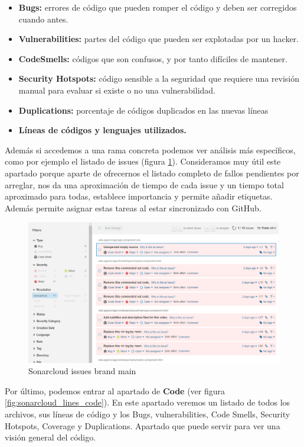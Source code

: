 \begin{itemize}
    \item \textbf{Bugs:} errores de código que pueden romper el código y deben ser corregidos cuando antes. 
    \item \textbf{Vulnerabilities:} partes del código que pueden ser explotadas por un hacker.
    \item \textbf{CodeSmells: } códigos que son confusos, y por tanto difíciles de mantener.
    \item \textbf{Security Hotspots: } código sensible a la seguridad que requiere una revisión manual para evaluar si existe o no una vulnerabilidad.
    \item \textbf{Duplications:} porcentaje de códigos duplicados en las nuevas líneas
    \item \textbf{Líneas de códigos y lenguajes utilizados.}
\end{itemize}

Además si accedemos a una rama concreta podemos ver análisis más específicos, como por ejemplo el listado de issues (figura \ref{fig:sonarcloud_issues}). Consideramos muy útil este apartado porque aparte de ofrecernos el listado completo de fallos pendientes por arreglar, nos da una aproximación de tiempo de cada issue y un tiempo total aproximado para todas, establece importancia y permite añadir etiquetas. Además permite asignar estas tareas al estar sincronizado con GitHub.

\begin{figure}[h!] 
\centering
    \includegraphics[width=1\textwidth]{img/sonarcloud_issues_1.PNG}
\caption{Sonarcloud issues brand main}
\label{fig:sonarcloud_issues}
\end{figure}

\newpage
Por último, podemos entrar al apartado de \textbf{Code} (ver figura \ref{fig:sonarcloud_lines_code}). En este apartado veremos un listado de todos los archivos, sus líneas de código y los Bugs, vulnerabilities, Code Smells, Security Hotspots, Coverage y Duplications. Apartado que puede servir para ver una visión general del código. 

